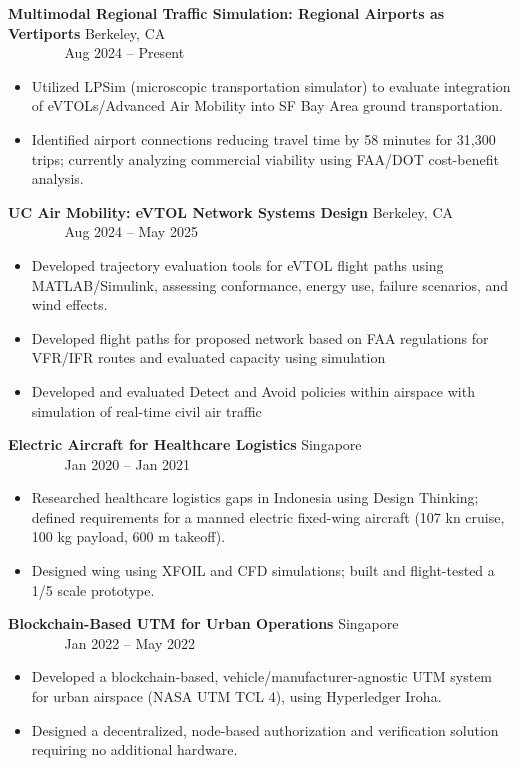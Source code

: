 \documentclass[10t]{article}
\begin{document}
\textbf{Multimodal Regional Traffic Simulation: Regional Airports as Vertiports} \hfill Berkeley, CA\\
\textcolor{white}{\textbf{Project}} \hfill Aug 2024 -- Present
\begin{itemize}[noitemsep]
    \item Utilized LPSim (microscopic transportation simulator) to evaluate integration of eVTOLs/Advanced Air Mobility into SF Bay Area ground transportation.
    \item Identified airport connections reducing travel time by 58 minutes for 31,300 trips; currently analyzing commercial viability using FAA/DOT cost-benefit analysis.
\end{itemize}

\textbf{UC Air Mobility: eVTOL Network Systems Design} \hfill Berkeley, CA\\
\textcolor{white}{\textbf{Project}} \hfill Aug 2024 -- May 2025
\begin{itemize}[noitemsep]
    \item Developed trajectory evaluation tools for eVTOL flight paths using MATLAB/Simulink, assessing conformance, energy use, failure scenarios, and wind effects.
    \item Developed flight paths for proposed network based on FAA regulations for VFR/IFR routes and evaluated capacity using simulation
    \item Developed and evaluated Detect and Avoid policies within airspace with simulation of real-time civil air traffic
\end{itemize}

\textbf{Electric Aircraft for Healthcare Logistics} \hfill Singapore\\
\textcolor{white}{\textbf{Project}} \hfill Jan 2020 -- Jan 2021
\begin{itemize}[noitemsep]
    \item Researched healthcare logistics gaps in Indonesia using Design Thinking; defined requirements for a manned electric fixed-wing aircraft (107 kn cruise, 100 kg payload, 600 m takeoff).
    \item Designed wing using XFOIL and CFD simulations; built and flight-tested a 1/5 scale prototype.
\end{itemize}

\textbf{Blockchain-Based UTM for Urban Operations} \hfill Singapore\\
\textcolor{white}{\textbf{Project}} \hfill Jan 2022 -- May 2022
\begin{itemize}[noitemsep]
    \item Developed a blockchain-based, vehicle/manufacturer-agnostic UTM system for urban airspace (NASA UTM TCL 4), using Hyperledger Iroha.
    \item Designed a decentralized, node-based authorization and verification solution requiring no additional hardware.
\end{itemize}
\end{document}
